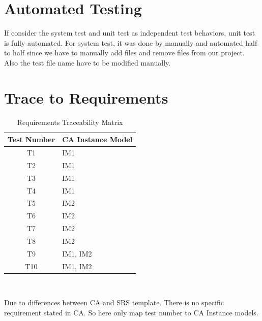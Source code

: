 \documentclass[12pt, titlepage]{article}
\begin{document}
\section{Automated Testing}
If consider the system test and unit test as independent test behaviors,  unit test is fully automated. For system test, it was done by manually and automated half to half since we have to 
manually add files and remove files from our project. Also the test file name have to be modified manually.		
\section{Trace to Requirements}
\begin{table} [H]
  \caption{Requirements Traceability Matrix}
  \label{Table:Table_Traceability_CA}  
\begin{tabular}{|c|p{8cm}|}
  \hline	
  \textbf{Test Number} & \textbf{CA Instance Model}\\
  \hline 
   T1& IM1\\ \hline
   T2& IM1\\ \hline
   T3& IM1\\ \hline
   T4& IM1\\ \hline
   T5& IM2\\ \hline
   T6& IM2\\ \hline
   T7& IM2\\ \hline
   T8& IM2\\ \hline
   T9& IM1, IM2\\ \hline
   T10& IM1, IM2\\ \hline

\end{tabular}\\
\end{table}
Due to differences between CA and SRS template. There is no specific requirement stated in CA. So here only map test number to CA Instance models.		
\end{document}
